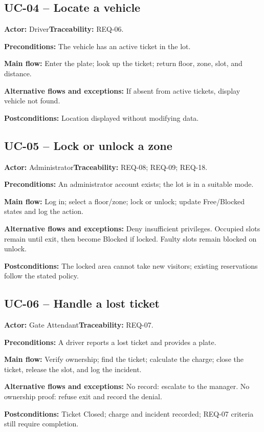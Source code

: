 \subsection{UC-04 -- Locate a vehicle}
\noindent\textbf{Actor:} Driver\quad\textbf{Traceability:} REQ-06.
\par\textbf{Preconditions:} The vehicle has an active ticket in the lot.
\par\textbf{Main flow:} Enter the plate; look up the ticket; return floor, zone, slot, and distance.
\par\textbf{Alternative flows and exceptions:} If absent from active tickets, display vehicle not found.
\par\textbf{Postconditions:} Location displayed without modifying data.
\subsection{UC-05 -- Lock or unlock a zone}
\noindent\textbf{Actor:} Administrator\quad\textbf{Traceability:} REQ-08; REQ-09; REQ-18.
\par\textbf{Preconditions:} An administrator account exists; the lot is in a suitable mode.
\par\textbf{Main flow:} Log in; select a floor/zone; lock or unlock; update Free/Blocked states and log the action.
\par\textbf{Alternative flows and exceptions:} Deny insufficient privileges. Occupied slots remain until exit, then become Blocked if locked. Faulty slots remain blocked on unlock.
\par\textbf{Postconditions:} The locked area cannot take new visitors; existing reservations follow the stated policy.
\subsection{UC-06 -- Handle a lost ticket}
\noindent\textbf{Actor:} Gate Attendant\quad\textbf{Traceability:} REQ-07.
\par\textbf{Preconditions:} A driver reports a lost ticket and provides a plate.
\par\textbf{Main flow:} Verify ownership; find the ticket; calculate the charge; close the ticket, release the slot, and log the incident.
\par\textbf{Alternative flows and exceptions:} No record: escalate to the manager. No ownership proof: refuse exit and record the denial.
\par\textbf{Postconditions:} Ticket Closed; charge and incident recorded; REQ-07 criteria still require completion.
